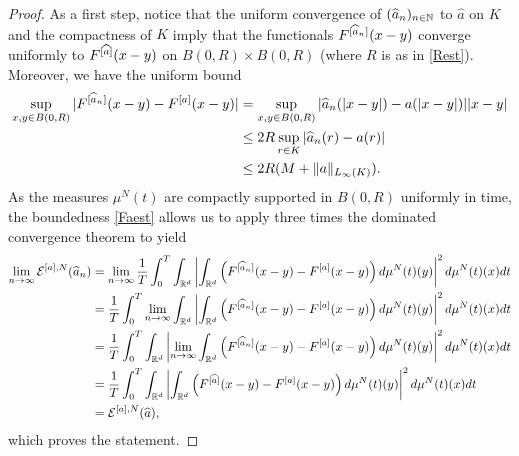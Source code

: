 \begin{proof}
As a first step, notice that the uniform convergence of $(\widehat a_n)_{n \in \mathbb{N}}$ to $\widehat a$ on $K$ and the compactness of $K$ imply that the functionals $F^{[\widehat a_n]}(x-y)$ converge uniformly to $F^{[\widehat a]}(x-y)$ on $B(0,R)\times B(0,R)$ (where $R$ is as in \eqref{Rest}). Moreover, we have the uniform bound
\begin{align}
\begin{split}\label{Faest}
\sup_{x,y\in B(0,R)}|F^{[\widehat a_n]}(x-y) - F^{[a]}(x-y)| &= \sup_{x,y\in B(0,R)}|\widehat a_n(|x-y|) -  a(|x-y|)| |x-y| \\
&\leq 2R \sup_{r\in K} |\widehat a_n(r) -  a(r)| \\
& \leq 2R(M + \|a\|_{L_{\infty}(K)}).
\end{split}
\end{align}
As the measures $\mu^N(t)$ are compactly supported in $B(0,R)$ uniformly in time, the boundedness \eqref{Faest} allows us to apply three times the dominated convergence theorem to yield
\begin{align*}
\lim_{n \rightarrow \infty}  \mathcal E^{[a],N} (\widehat a_n) &= \lim_{n \rightarrow \infty}\frac{1}{T}\int_0^T\int_{\mathbb{R}^d} \left| \int_{\mathbb{R}^d}
			\left(F^{[\widehat a_n]}(x-y)-F^{[a]}(x-y)\right)d\mu^N(t)(y)\right|^2d\mu^N(t)(x) dt\\
			&= \frac{1}{T}\int_0^T\lim_{n \rightarrow \infty}\int_{\mathbb{R}^d} \left| \int_{\mathbb{R}^d}
			\left(F^{[\widehat a_n]}(x-y)-F^{[a]}(x-y)\right)d\mu^N(t)(y)\right|^2 d\mu^N(t)(x) dt\\
			&= \frac{1}{T}\int_0^T\int_{\mathbb{R}^d} \left| \lim_{n \rightarrow \infty}\int_{\mathbb{R}^d}
			\left(F^{[\widehat a_n]}(x-y)-F^{[a]}(x-y)\right)d\mu^N(t)(y)\right|^2 d\mu^N(t)(x) dt\\
			&= \frac{1}{T}\int_0^T\int_{\mathbb{R}^d} \left| \int_{\mathbb{R}^d}
			\left(F^{[\widehat a]}(x-y)-F^{[a]}(x-y)\right)d\mu^N(t)(y)\right|^2 d\mu^N(t)(x) dt\\
&=  \mathcal E^{[a],N}(\widehat a),
\end{align*}
which proves the statement.


\end{proof}
